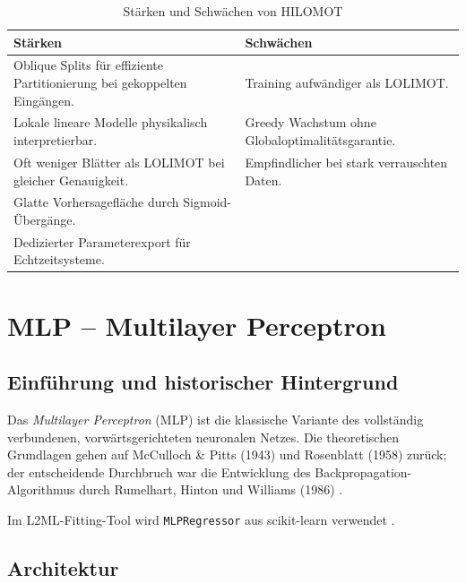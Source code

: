 \documentclass[11pt,a4paper]{report}
\begin{document}
\begin{table}[H]
\centering
\caption{St\"{a}rken und Schw\"{a}chen von HILOMOT}
\label{tab:hilomot_pros_cons}
\begin{tabular}{p{6.5cm}p{6.5cm}}
\toprule
\textbf{St\"{a}rken} & \textbf{Schw\"{a}chen} \\
\midrule
Oblique Splits f\"{u}r effiziente Partitionierung bei gekoppelten Eing\"{a}ngen. & Training aufw\"{a}ndiger als LOLIMOT. \\
Lokale lineare Modelle physikalisch interpretierbar. & Greedy Wachstum ohne Globaloptimalit\"{a}tsgarantie. \\
Oft weniger Bl\"{a}tter als LOLIMOT bei gleicher Genauigkeit. & Empfindlicher bei stark verrauschten Daten. \\
Glatte Vorhersagefl\"{a}che durch Sigmoid-\"{U}berg\"{a}nge. & \\
Dedizierter Parameterexport f\"{u}r Echtzeitsysteme. & \\
\bottomrule
\end{tabular}
\end{table}

\chapter{MLP -- Multilayer Perceptron}

\section{Einf\"{u}hrung und historischer Hintergrund}

Das \emph{Multilayer Perceptron} (MLP) ist die klassische Variante des vollst\"{a}ndig verbundenen,
vorw\"{a}rtsgerichteten neuronalen Netzes. Die theoretischen Grundlagen gehen auf McCulloch \& Pitts
(1943) und Rosenblatt (1958) zur\"{u}ck; der entscheidende Durchbruch war die Entwicklung des
Backpropagation-Algorithmus durch Rumelhart, Hinton und Williams (1986)
\cite{rumelhart1986, goodfellow2016, haykin2009}.

Im L2ML-Fitting-Tool wird \texttt{MLPRegressor} aus scikit-learn verwendet \cite{sklearn_mlp, pedregosa2011}.

\section{Architektur}
\label{sec:mlp_architecture}
\end{document}
